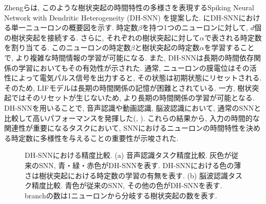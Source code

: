 Zhengらは, このような樹状突起の時間特性の多様さを表現するSpiking Neural Network with Dendritic Heterogeneity (DH-SNN) を提案した.
にDH-SNNにおける単一ニューロンの概要図を示す.
時定数$\beta$を持つ1つのニューロンに対して, $d$個の樹状突起を接続する.
さらに, それぞれの樹状突起に対して$\alpha$で表される時定数を割り当てる.
このニューロンの時定数$\beta$と樹状突起の時定数$\alpha$を学習することで, より複雑な時間情報の学習が可能になる.
また, DH-SNNは長期の時間依存関係の学習においてもその有効性が示された.
通常, ニューロンの膜電位はその活性によって電気パルス信号を出力すると, その状態は初期状態にリセットされる.
そのため, LIFモデルは長期の時間関係の記憶が困難とされている.
一方, 樹状突起ではそのリセットが生じないため, より長期の時間関係の学習が可能となる.
DH-SNNを用いることで, 音声認識や動画認識, 脳波認識において, 通常のSNNと比較して高いパフォーマンスを発揮した(, ).
これらの結果から, 入力の時間的な関連性が重要になるタスクにおいて, SNNにおけるニューロンの時間特性を決める時定数に多様性を与えることの重要性が示唆された.
\begin{figure}
    \centering

    \parbox{1.0\textwidth}{
        \centering

        \begin{minipage}{0.5336\textwidth}
            
            \label{fig:dhsnn:voice}
        \end{minipage}
        \hspace{0.02\textwidth}
        \begin{minipage}{0.3663\textwidth}
            
            \label{fig:dhsnn:brain}
        \end{minipage}

        \caption[DH-SNNにおける精度比較]{
            DH-SNNにおける精度比較\cite{dhsnn}.
            (a) 音声認識タスク精度比較.
            灰色が従来のSNN, 青・緑・赤色がDH-SNNを表す.
            DH-SNNにおける色の薄さは樹状突起における時定数の学習の有無を表す.
            (b) 脳波認識タスク精度比較.
            青色が従来のSNN, その他の色がDH-SNNを表す.
            branchの数は1ニューロンから分岐する樹状突起の数を表す.
        }
    }
\end{figure}
